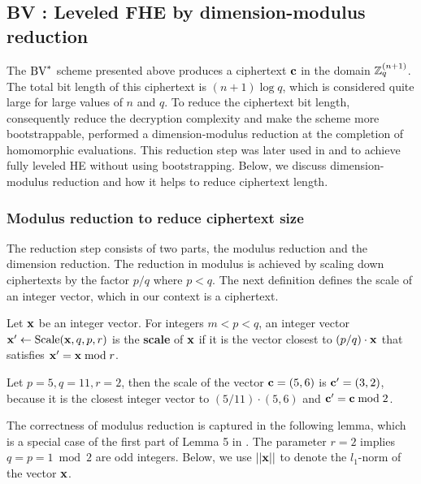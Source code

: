 \documentclass[../main.tex]{subfiles}
\begin{document}
\subsection{BV : Leveled FHE by dimension-modulus reduction}\label{subsec:modulus reduction}

The $\text{BV}^*$ scheme presented above produces a ciphertext $\mathbf{c}$ in the domain $\mathbb{Z}_q^{(n+1)}$. The total bit length of this ciphertext is $(n+1)\log q$, which is considered quite large for large values of $n$ and $q$. To reduce the ciphertext bit length, consequently reduce the decryption complexity and make the scheme more bootstrappable, \cite{brakerski2014efficient} performed a dimension-modulus reduction at the completion of homomorphic evaluations. This reduction step was later used in \cite{brakerski2014leveled} and \cite{brakerski2012fully} to achieve fully leveled HE without using bootstrapping. Below, we discuss dimension-modulus reduction and how it helps to reduce ciphertext length. 


\subsubsection{Modulus reduction to reduce ciphertext size}

The reduction step consists of two parts, the modulus reduction and the dimension reduction. The reduction in modulus is achieved by scaling down ciphertexts by the factor $p/q$ where $p<q$. The next definition defines the scale of an integer vector, which in our context is a ciphertext. 

\begin{definition}
Let $\mathbf{x}$ be an integer vector. For integers $m<p<q$, an integer vector $\mathbf{x}' \leftarrow \text{Scale}(\mathbf{x},q,p,r)$ is the \textbf{scale} of $\mathbf{x}$ 
\reversemarginpar
{}
if it is the vector closest to $(p/q) \cdot \mathbf{x}$ that satisfies $\mathbf{x}'=\mathbf{x} \bmod r$.
\end{definition}

\begin{example}
Let $p=5,q=11,r=2$, then the scale of the vector $\mathbf{c}=(5,6)$ is $\mathbf{c}'=(3,2)$, because it is the closest integer vector to $(5/11) \cdot (5,6)$ and $\mathbf{c}'=\mathbf{c} \bmod 2$. 
\end{example}

The correctness of modulus reduction is captured in the following lemma, which is a special case of the first part of Lemma 5 in \cite{brakerski2014leveled}. The parameter $r=2$ implies $q=p=1 \bmod 2$ are odd integers. %
Below, we use $||\mathbf{x}||$ to denote the $l_1$-norm of the vector $\mathbf{x}$. 
\end{document}

